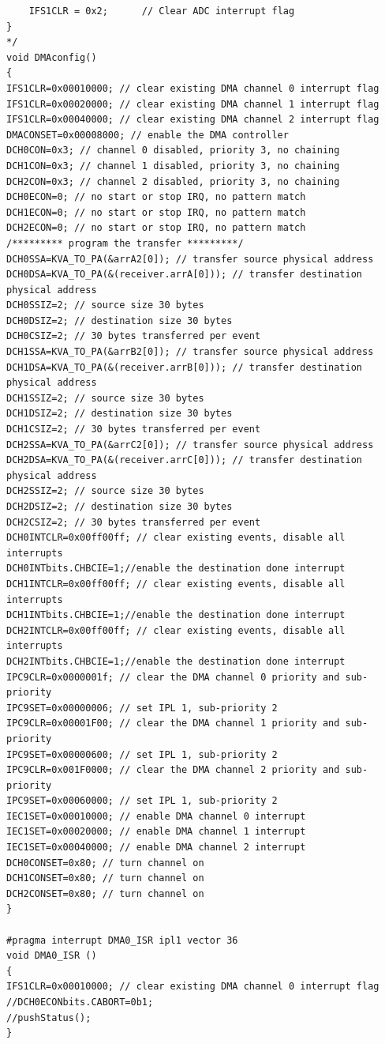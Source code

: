 \documentclass[12pt]{article}
\begin{document}
\begin{lstlisting}
	IFS1CLR = 0x2; 		// Clear ADC interrupt flag
}
*/
void DMAconfig()
{
IFS1CLR=0x00010000; // clear existing DMA channel 0 interrupt flag
IFS1CLR=0x00020000; // clear existing DMA channel 1 interrupt flag
IFS1CLR=0x00040000; // clear existing DMA channel 2 interrupt flag
DMACONSET=0x00008000; // enable the DMA controller
DCH0CON=0x3; // channel 0 disabled, priority 3, no chaining
DCH1CON=0x3; // channel 1 disabled, priority 3, no chaining
DCH2CON=0x3; // channel 2 disabled, priority 3, no chaining
DCH0ECON=0; // no start or stop IRQ, no pattern match
DCH1ECON=0; // no start or stop IRQ, no pattern match
DCH2ECON=0; // no start or stop IRQ, no pattern match
/********* program the transfer *********/
DCH0SSA=KVA_TO_PA(&arrA2[0]); // transfer source physical address
DCH0DSA=KVA_TO_PA(&(receiver.arrA[0])); // transfer destination physical address
DCH0SSIZ=2; // source size 30 bytes
DCH0DSIZ=2; // destination size 30 bytes
DCH0CSIZ=2; // 30 bytes transferred per event
DCH1SSA=KVA_TO_PA(&arrB2[0]); // transfer source physical address
DCH1DSA=KVA_TO_PA(&(receiver.arrB[0])); // transfer destination physical address
DCH1SSIZ=2; // source size 30 bytes
DCH1DSIZ=2; // destination size 30 bytes
DCH1CSIZ=2; // 30 bytes transferred per event
DCH2SSA=KVA_TO_PA(&arrC2[0]); // transfer source physical address
DCH2DSA=KVA_TO_PA(&(receiver.arrC[0])); // transfer destination physical address
DCH2SSIZ=2; // source size 30 bytes
DCH2DSIZ=2; // destination size 30 bytes
DCH2CSIZ=2; // 30 bytes transferred per event
DCH0INTCLR=0x00ff00ff; // clear existing events, disable all interrupts
DCH0INTbits.CHBCIE=1;//enable the destination done interrupt
DCH1INTCLR=0x00ff00ff; // clear existing events, disable all interrupts
DCH1INTbits.CHBCIE=1;//enable the destination done interrupt
DCH2INTCLR=0x00ff00ff; // clear existing events, disable all interrupts
DCH2INTbits.CHBCIE=1;//enable the destination done interrupt
IPC9CLR=0x0000001f; // clear the DMA channel 0 priority and sub-priority
IPC9SET=0x00000006; // set IPL 1, sub-priority 2
IPC9CLR=0x00001F00; // clear the DMA channel 1 priority and sub-priority
IPC9SET=0x00000600; // set IPL 1, sub-priority 2
IPC9CLR=0x001F0000; // clear the DMA channel 2 priority and sub-priority
IPC9SET=0x00060000; // set IPL 1, sub-priority 2
IEC1SET=0x00010000; // enable DMA channel 0 interrupt
IEC1SET=0x00020000; // enable DMA channel 1 interrupt
IEC1SET=0x00040000; // enable DMA channel 2 interrupt
DCH0CONSET=0x80; // turn channel on
DCH1CONSET=0x80; // turn channel on
DCH2CONSET=0x80; // turn channel on
}

#pragma interrupt DMA0_ISR ipl1 vector 36
void DMA0_ISR ()
{
IFS1CLR=0x00010000; // clear existing DMA channel 0 interrupt flag
//DCH0ECONbits.CABORT=0b1;
//pushStatus();
}


\end{lstlisting}
\end{document}
